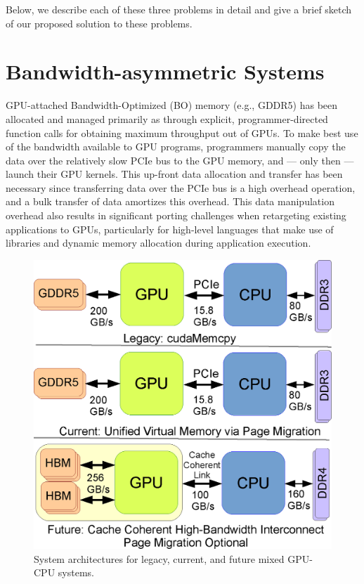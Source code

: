 Below, we describe each of these three problems in detail and give a brief
sketch of our proposed solution to these problems.

\section{Bandwidth-asymmetric Systems}
GPU-attached Bandwidth-Optimized (BO) memory (e.g., GDDR5) has been allocated
and managed primarily as through explicit, programmer-directed function calls
for obtaining maximum throughput out of GPUs.  To make best use of the bandwidth
available to GPU programs, programmers manually copy the data over the
relatively slow PCIe bus to the GPU memory, and --- only then --- launch their
GPU kernels.  This up-front data allocation and transfer has been necessary
since transferring data over the PCIe bus is a high overhead operation, and a
bulk transfer of data amortizes this overhead.  This data manipulation overhead
also results in significant porting challenges when retargeting existing
applications to GPUs, particularly for high-level languages that make use of
libraries and dynamic memory allocation during application execution.

\begin{figure}[t]
    \centering
    \includegraphics[width=0.7\columnwidth]{hpca2015/figures/architecture.eps}
    \caption{System architectures for legacy, current, and future mixed GPU-CPU systems.}
    \label{fig:arch-hpca2015}
\end{figure}

